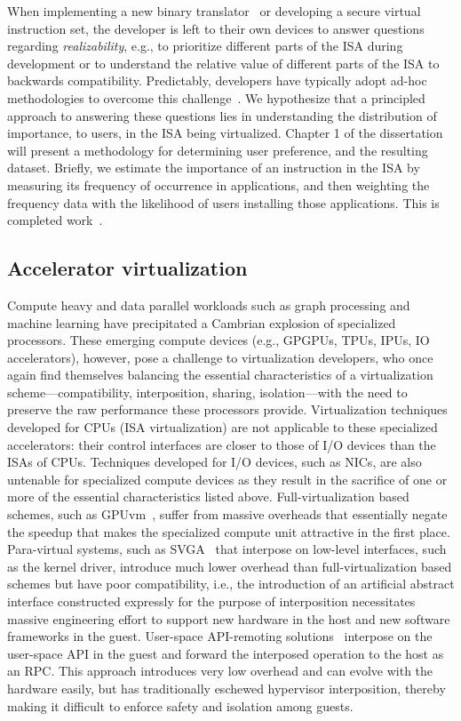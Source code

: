 When implementing a new binary translator~\cite{HVX} or developing a
secure virtual instruction set, the developer is left to
their own devices to answer questions regarding \emph{realizability}, e.g., to
prioritize different parts of the ISA during development or to understand the
relative value of different parts of the ISA to backwards compatibility.
Predictably, developers have typically adopt ad-hoc methodologies to overcome
this challenge~\cite{bugnion-workstation}. We hypothesize that a principled
approach to answering these questions lies in understanding the distribution
of importance, to users, in the ISA being virtualized. Chapter 1 of the
dissertation will present a methodology for determining user preference, and
the resulting dataset.
Briefly, we estimate the importance of an instruction in the ISA by measuring
its frequency of occurrence in applications, and then weighting the frequency
data with the likelihood of users installing those applications. This is
completed work~\cite{x86-systor}.

\subsection{Accelerator virtualization}
Compute heavy and data parallel workloads such as graph processing and machine
learning have precipitated a Cambrian explosion of specialized processors.
These emerging compute devices (e.g., GPGPUs, TPUs, IPUs, IO accelerators),
however, pose a challenge to virtualization developers, who once again find
themselves balancing the essential characteristics of a virtualization
scheme---compatibility, interposition, sharing, isolation---with the need to
preserve the raw performance these processors provide. Virtualization
techniques developed for CPUs (ISA virtualization) are not applicable to these
specialized accelerators: their control interfaces are closer to those of I/O
devices than the ISAs of CPUs.
Techniques developed for I/O devices, such as NICs, are also untenable for
specialized compute devices as they result in the sacrifice of one or more of
the essential characteristics listed above.
Full-virtualization based schemes, such as GPUvm~\cite{suzuki2014gpuvm},
suffer from massive overheads that essentially negate the speedup that makes
the specialized compute unit attractive in the first place.
Para-virtual systems, such as SVGA~\cite{vmware-virtual-gpu} that interpose on
low-level interfaces, such as the kernel driver, introduce much lower overhead
than full-virtualization based schemes but have poor compatibility, i.e., the
introduction of an artificial abstract interface constructed expressly for the
purpose of interposition necessitates massive engineering effort to support
new hardware in the host and new software frameworks in the guest.
User-space API-remoting solutions~\cite{vmCUDA,rCUDA,rCUDAnew} interpose on
the user-space API in the guest and forward the interposed operation to the
host as an RPC. This approach introduces very low overhead and can evolve with
the hardware easily, but has traditionally eschewed hypervisor interposition,
thereby making it difficult to enforce safety and isolation among guests.

